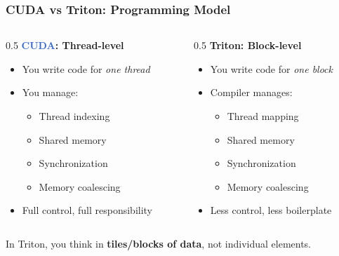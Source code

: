 \documentclass[aspectratio=169]{beamer}
\begin{document}
\begin{frame}
	\frametitle{CUDA vs Triton: Programming Model}
	\begin{columns}
		\begin{column}{0.5\textwidth}
			\textbf{\textcolor{highlight}{CUDA}: Thread-level}
			\begin{itemize}
				\item You write code for \textit{one thread}
				\item You manage:
				      \begin{itemize}
					      \item Thread indexing
					      \item Shared memory
					      \item Synchronization
					      \item Memory coalescing
				      \end{itemize}
				\item Full control, full responsibility
			\end{itemize}
		\end{column}
		\begin{column}{0.5\textwidth}
			\textbf{\textcolor{codegreen}{Triton}: Block-level}
			\begin{itemize}
				\item You write code for \textit{one block}
				\item Compiler manages:
				      \begin{itemize}
					      \item Thread mapping
					      \item Shared memory
					      \item Synchronization
					      \item Memory coalescing
				      \end{itemize}
				\item Less control, less boilerplate
			\end{itemize}
		\end{column}
	\end{columns}
	\vspace{1em}
	\begin{center}
		In Triton, you think in \textbf{tiles/blocks of data}, not individual elements.
	\end{center}
\end{frame}
\end{document}

